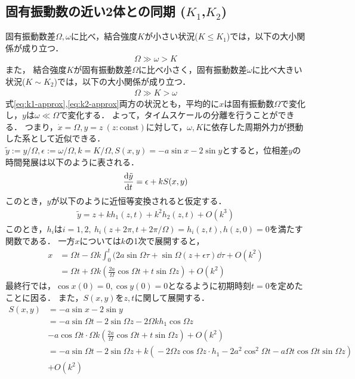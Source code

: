 \documentclass[../main]{subfiles}
\begin{document}
\subsection{固有振動数の近い2体との同期 ($K_1$,$K_2$)}
固有振動数差$\Omega,\omega$に比べ，結合強度$K$が小さい状況($K\leq K_1$)では，以下の大小関係が成り立つ．
\begin{align}
    \label{eq:k1-approx}
    \Omega\gg\omega>K
\end{align}
また，
結合強度$K$が固有振動数差$\Omega$に比べ小さく，固有振動数差$\omega$に比べ大きい状況($K\sim K_2$)では，以下の大小関係が成り立つ．
\begin{align}
    \label{eq:k2-approx}
    \Omega\gg K>\omega
\end{align}
式\eqref{eq:k1-approx},\eqref{eq:k2-approx}両方の状況とも，平均的に$x$は固有振動数$\Omega$で変化し，$y$は$\omega\ll\Omega$で変化する．
よって，タイムスケールの分離を行うことができる．
つまり，$\dot{x}=\Omega, y=z\ (z:\textrm{const})$に対して，$\omega,K$に依存した周期外力が摂動した系として近似できる．\\
    $\tilde{y}:=y/\Omega,\epsilon:=\omega/\Omega,k=K/\Omega,S(x,y)=-a\sin x-2\sin y$とすると，位相差$y$の時間発展は以下のように表される．
    \begin{align*}
        \dv{\tilde{y}}{t}=\epsilon+k S(x,y) 
    \end{align*}
    このとき，$y$が以下のように近恒等変換されると仮定する．
    \begin{align}
        \tilde{y}=z+kh_1(z,t)+k^2h_2(z,t)+O(k^3)
        \label{eq:pertu-ytilde}
    \end{align}
    このとき，$h_i$は$i=1,2,\ h_i(z+2\pi,t+2\pi/\Omega)=h_i(z,t),h(z,0)=0$を満たす関数である．
    一方$x$については$k$の1次で展開すると，
    \begin{align*}
        x&=\Omega t-\Omega k\int_0^t(2a\sin \Omega\tau+\sin\Omega (z+\epsilon\tau)\dd{\tau}+O(k^2)\\ 
        &=\Omega t+\Omega k\left(\frac{2a}{\Omega}\cos\Omega t+t\sin \Omega z\right)+O(k^2)
    \end{align*}
    最終行では，$\cos x(0)=0,\cos y(0)=0$となるように初期時刻$t=0$を定めたことに因る．
    また，$S(x,y)$を$z,t$に関して展開する．
    \begin{align*}
        S(x,y)&=-a\sin x-2\sin y\\
        &=-a\sin\Omega t-2\sin \Omega z-2\Omega kh_1\cos\Omega z\\
        &-a\cos\Omega t\cdot \Omega k\left(\frac{2a}{\Omega}\cos \Omega t+t\sin \Omega z\right)+O(k^2)\\
        &=-a\sin\Omega t-\!2\sin \Omega z       +k\left(\!-2\Omega z \cos\Omega z\cdot h_1-\!2a^2\cos^2\Omega t-\!a\Omega t\cos \Omega  t\sin \Omega z\right)\\
        &+O(k^2)
    \end{align*}
\end{document}

